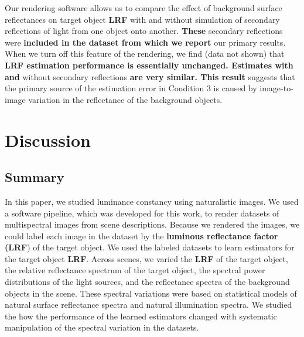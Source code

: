 \documentclass{jov}
\providecommand{\DIFaddtex}[1]{{\bf #1}} %
\providecommand{\DIFdeltex}[1]{} %
\providecommand{\DIFaddbegin}{} %
\providecommand{\DIFaddend}{} %
\providecommand{\DIFdelbegin}{} %
\providecommand{\DIFdelend}{} %
\providecommand{\DIFadd}[1]{\texorpdfstring{\DIFaddtex{#1}}{#1}} %
\providecommand{\DIFdel}[1]{\texorpdfstring{\DIFdeltex{#1}}{}} %
\newcommand{\DIFscaledelfig}{0.5}
\newlength{\DIFdelgraphicswidth} %
\newlength{\DIFdelgraphicsheight} %
\newcommand{\DIFaddincludegraphics}[2][]{{\color{blue}\fbox{\DIFOincludegraphics[#1]{#2}}}} %
\newcommand{\DIFdelincludegraphics}[2][]{%
\sbox{\DIFdelgraphicsbox}{\DIFOincludegraphics[#1]{#2}}%
\settoboxwidth{\DIFdelgraphicswidth}{\DIFdelgraphicsbox} %
\settoboxtotalheight{\DIFdelgraphicsheight}{\DIFdelgraphicsbox} %
\scalebox{\DIFscaledelfig}{%
\parbox[b]{\DIFdelgraphicswidth}{\usebox{\DIFdelgraphicsbox}\\[-\baselineskip] \rule{\DIFdelgraphicswidth}{0em}}\llap{\resizebox{\DIFdelgraphicswidth}{\DIFdelgraphicsheight}{%
\setlength{\unitlength}{\DIFdelgraphicswidth}%
\begin{picture}(1,1)%
\thicklines\linethickness{2pt} %
{\color[rgb]{1,0,0}\put(0,0){\framebox(1,1){}}}%
{\color[rgb]{1,0,0}\put(0,0){\line( 1,1){1}}}%
{\color[rgb]{1,0,0}\put(0,1){\line(1,-1){1}}}%
\end{picture}%
}\hspace*{3pt}}} %
} %
\DeclareRobustCommand{\DIFaddbegin}{\DIFOaddbegin \let\includegraphics\DIFaddincludegraphics} %
\DeclareRobustCommand{\DIFaddend}{\DIFOaddend \let\includegraphics\DIFOincludegraphics} %
\DeclareRobustCommand{\DIFdelbegin}{\DIFOdelbegin \let\includegraphics\DIFdelincludegraphics} %
\DeclareRobustCommand{\DIFdelend}{\DIFOaddend \let\includegraphics\DIFOincludegraphics} %
\begin{document}
Our rendering software allows us to compare the effect of background surface reflectances on target object \DIFdelbegin \DIFdel{LRV }\DIFdelend \DIFaddbegin \DIFadd{LRF }\DIFaddend with and without simulation of secondary reflections of light from one object onto another. 
\DIFdelbegin \DIFdel{Such }\DIFdelend \DIFaddbegin \DIFadd{These }\DIFaddend secondary reflections were \DIFdelbegin \DIFdel{simulated for }\DIFdelend \DIFaddbegin \DIFadd{included in the dataset from which we report }\DIFaddend our primary results. 
When we turn off this feature of the rendering, we find (data not shown) that \DIFdelbegin \DIFdel{that the secondary reflections have minimal effect on LRV estimation :
the estimates }\DIFdelend \DIFaddbegin \DIFadd{LRF estimation performance is essentially unchanged. 
Estimates with and }\DIFaddend without secondary reflections \DIFdelbegin \DIFdel{were similarto those with reflections. 
This }\DIFdelend \DIFaddbegin \DIFadd{are very similar. 
This result }\DIFaddend suggests that the primary source of the estimation error in Condition 3 is caused by image-to-image variation in the reflectance of the background objects\DIFdelbegin \DIFdel{,
which in turn affects the normalized contrast representation of the target}\DIFdelend .

\section{Discussion} \label{Discussion}

\subsection{Summary}
In this paper, we studied luminance constancy using naturalistic images.
We used a software pipeline, which was developed for this work, to render datasets of multispectral images from scene descriptions.
Because we rendered the images, we could label each image in the dataset by the \DIFdelbegin \DIFdel{light reflectance value (LRV}\DIFdelend \DIFaddbegin \DIFadd{luminous reflectance factor (LRF}\DIFaddend ) of the target object.
We used the labeled datasets to learn estimators for the target object \DIFdelbegin \DIFdel{LRV}\DIFdelend \DIFaddbegin \DIFadd{LRF}\DIFaddend .
Across scenes, we varied the \DIFdelbegin \DIFdel{LRV }\DIFdelend \DIFaddbegin \DIFadd{LRF }\DIFaddend of the target object, the relative reflectance spectrum of the target object, 
the spectral power distributions of the light sources, and the reflectance spectra of the background objects in the scene.
These spectral variations were based on statistical models of natural surface reflectance spectra and natural illumination spectra.
We studied the how the performance of the learned estimators changed with systematic manipulation of the spectral variation in the datasets.
\end{document}
